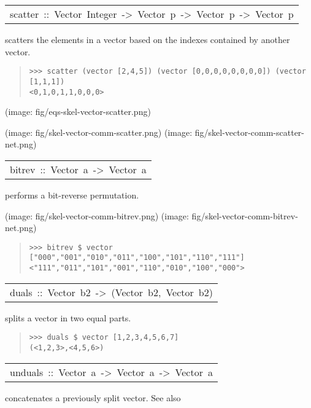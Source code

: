 \begin{haddockdesc}
\item[\begin{tabular}{@{}l}
scatter\ ::\ Vector\ Integer\ ->\ Vector\ p\ ->\ Vector\ p\ ->\ Vector\ p
\end{tabular}]\haddockbegindoc
scatters the elements in a vector based on the indexes contained by another vector.\par
\begin{quote}
{\haddockverb\begin{verbatim}
>>> scatter (vector [2,4,5]) (vector [0,0,0,0,0,0,0,0]) (vector [1,1,1])
<0,1,0,1,1,0,0,0>

\end{verbatim}}
\end{quote}(image: fig/eqs-skel-vector-scatter.png)\par
           (image: fig/skel-vector-comm-scatter.png)
 (image: fig/skel-vector-comm-scatter-net.png)\par
           
\end{haddockdesc}
\begin{haddockdesc}
\item[\begin{tabular}{@{}l}
bitrev\ ::\ Vector\ a\ ->\ Vector\ a
\end{tabular}]\haddockbegindoc
performs a bit-reverse permutation.\par
(image: fig/skel-vector-comm-bitrev.png)
 (image: fig/skel-vector-comm-bitrev-net.png)\par
\begin{quote}
{\haddockverb\begin{verbatim}
>>> bitrev $ vector ["000","001","010","011","100","101","110","111"]
<"111","011","101","001","110","010","100","000">

\end{verbatim}}
\end{quote}
\end{haddockdesc}
\begin{haddockdesc}
\item[\begin{tabular}{@{}l}
duals\ ::\ Vector\ b2\ ->\ (Vector\ b2,\ Vector\ b2)
\end{tabular}]\haddockbegindoc
splits a vector in two equal parts.\par
\begin{quote}
{\haddockverb\begin{verbatim}
>>> duals $ vector [1,2,3,4,5,6,7]
(<1,2,3>,<4,5,6>)

\end{verbatim}}
\end{quote}
\end{haddockdesc}
\begin{haddockdesc}
\item[\begin{tabular}{@{}l}
unduals\ ::\ Vector\ a\ ->\ Vector\ a\ ->\ Vector\ a
\end{tabular}]\haddockbegindoc
concatenates a previously split vector. See also \par

\end{haddockdesc}
